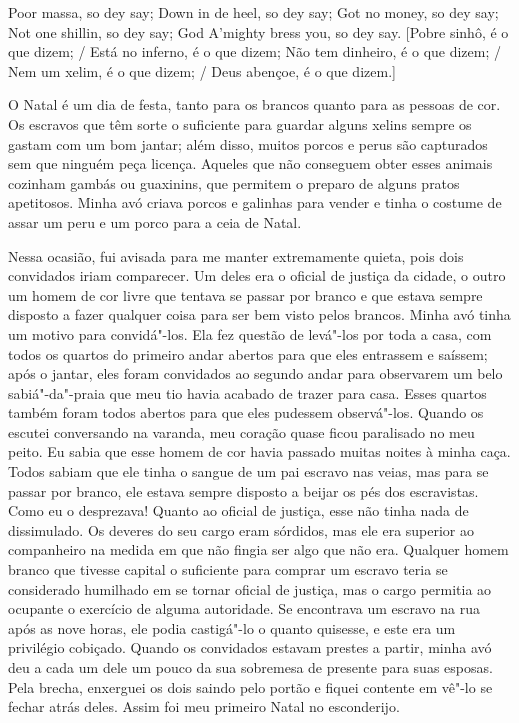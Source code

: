 Poor massa, so dey say; Down in de heel, so dey say; Got no money, so
dey say; Not one shillin, so dey say; God A'mighty bress you, so dey
say. {[}Pobre sinhô, é o que dizem; / Está no inferno, é o que dizem;
Não tem dinheiro, é o que dizem; / Nem um xelim, é o que dizem; / Deus
abençoe, é o que dizem.{]}

O Natal é um dia de festa, tanto para
os brancos quanto para as pessoas de cor. Os escravos que têm sorte o
suficiente para guardar alguns xelins sempre os gastam com um bom
jantar; além disso, muitos porcos e perus são capturados sem que ninguém
peça licença. Aqueles que não conseguem obter esses animais cozinham
gambás ou guaxinins, que permitem o preparo de alguns pratos apetitosos.
Minha avó criava porcos e galinhas para vender e tinha o costume de
assar um peru e um porco para a ceia de Natal.

Nessa ocasião, fui avisada para me
manter extremamente quieta, pois dois convidados iriam comparecer. Um
deles era o oficial de justiça da cidade, o outro um homem de cor livre
que tentava se passar por branco e que estava sempre disposto a fazer
qualquer coisa para ser bem visto pelos brancos. Minha avó tinha um
motivo para convidá"-los. Ela fez questão de levá"-los por toda a casa,
com todos os quartos do primeiro andar abertos para que eles entrassem e
saíssem; após o jantar, eles foram convidados ao segundo andar para
observarem um belo sabiá"-da"-praia que meu tio havia acabado de trazer
para casa. Esses quartos também foram todos abertos para que eles
pudessem observá"-los. Quando os escutei conversando na varanda, meu
coração quase ficou paralisado no meu peito. Eu sabia que esse homem de
cor havia passado muitas noites à minha caça. Todos sabiam que ele tinha
o sangue de um pai escravo nas veias, mas para se passar por branco, ele
estava sempre disposto a beijar os pés dos escravistas. Como eu o
desprezava! Quanto ao oficial de justiça, esse não tinha nada de
dissimulado. Os deveres do seu cargo eram sórdidos, mas ele era superior
ao companheiro na medida em que não fingia ser algo que não era.
Qualquer homem branco que tivesse capital o suficiente para comprar um
escravo teria se considerado humilhado em se tornar oficial de justiça,
mas o cargo permitia ao ocupante o exercício de alguma autoridade. Se
encontrava um escravo na rua após as nove horas, ele podia castigá"-lo o
quanto quisesse, e este era um privilégio cobiçado. Quando os convidados
estavam prestes a partir, minha avó deu a cada um dele um pouco da sua
sobremesa de presente para suas esposas. Pela brecha, enxerguei os dois
saindo pelo portão e fiquei contente em vê"-lo se fechar atrás deles.
Assim foi meu primeiro Natal no esconderijo.

